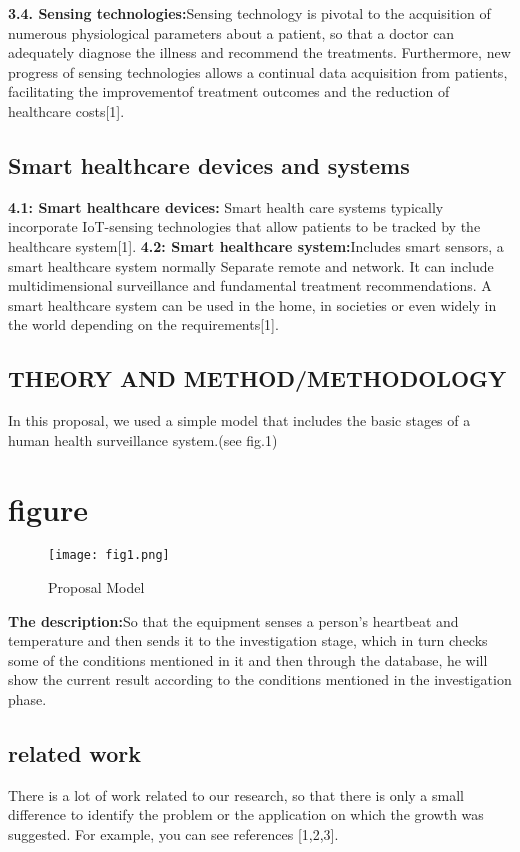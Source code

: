 \documentclass[paper=a4, fontsize=11pt]{scrartcl}
\numberwithin{equation}{section}		%
\numberwithin{figure}{section}			%
\numberwithin{table}{section}				%
\begin{document}
\begin{itemize}
    \textbf{3.4. Sensing technologies:}Sensing technology is pivotal to the acquisition of numerous physiological parameters about a patient, so that a doctor can adequately diagnose the illness and recommend the treatments. Furthermore, new progress of sensing technologies allows a continual data acquisition from patients, facilitating the improvementof treatment outcomes and the reduction of healthcare costs[1].
\end{itemize}

\section{Smart healthcare devices and systems}
\begin{itemize}
    \textbf{4.1: Smart healthcare devices: }Smart health care systems typically incorporate IoT-sensing technologies that allow patients to be tracked by the healthcare system[1].
    \textbf{4.2: Smart healthcare system:}Includes smart sensors, a smart healthcare system normally
Separate remote and network. It can include multidimensional surveillance and fundamental treatment recommendations. A smart healthcare system can be used in the home, in societies or even widely in the world depending on the requirements[1].
\end{itemize}

\section{THEORY AND METHOD/METHODOLOGY}
In this proposal, we used a simple model that includes the basic stages of a human health surveillance system.(see fig.1)
\chapter{figure}
    \begin{figure}
        \centering
        \texttt{[image: fig1.png]}
        \caption{Proposal Model }
        \label{fig: }
    \end{figure}
\textbf{The description:}So that the equipment senses a person's heartbeat and temperature and then sends it to the investigation stage, which in turn checks some of the conditions mentioned in it and then through the database, he will show the current result according to the conditions mentioned in the investigation phase.

\section{related work}
There is a lot of work related to our research, so that there is only a small difference to identify the problem or the application on which the growth was suggested. For example, you can see references [1,2,3].
\end{document}
